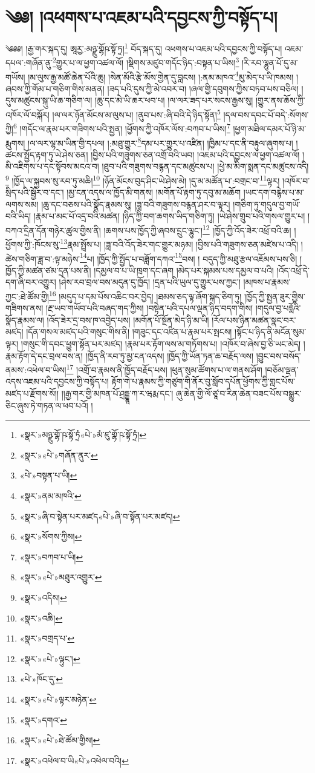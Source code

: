 \chapter{༄༅། །འཕགས་པ་འཇམ་པའི་དབྱངས་ཀྱི་བསྟོད་པ།}༄༅༅། །རྒྱ་གར་སྐད་དུ། ཨཱརྱ་:མཉྫུ་གྷོཥ་སྟོ་ཏྲ།\footnote{«སྣར་»མཉྫུ་གྷོ་ཥ་སྟོ་ཏྲཾ«པེ་»མཾ་ཛུ་གྷོ་ཥ་སྟོ་ཏྲཾ།} བོད་སྐད་དུ། འཕགས་པ་འཇམ་པའི་དབྱངས་ཀྱི་བསྟོད་པ། འཇམ་དཔལ་:གཞོན་ནུ་\footnote{«སྣར་»«པེ་»གཞོན་ནུར་}གྱུར་པ་ལ་ཕྱག་འཚལ་ལོ། །སྡིགས་མཛུབ་གདོང་ཉིད་:བསྟན་པ་ཡིས།\footnote{«པེ་»བསྟན་པ་ཡི།} །རི་རབ་ལྷུན་པོ་དུ་མ་གཡོས། །མ་ལུས་རྒྱ་མཚོ་ཆེན་པོའི་ཆུ། །སེན་མོའི་རྩེ་མོས་གྱེན་དུ་བླངས། །:ནམ་མཁའ་\footnote{«སྣར་»ནམ་མཁའི་}མུ་མེད་པ་ཡི་ཁམས། །ཞབས་ཀྱི་གོམ་པ་གཅིག་གིས་མནན། །ཟད་པའི་དུས་ཀྱི་མེ་འབར་བ། །ཞལ་གྱི་དབུགས་ཀྱིས་བཏབ་པས་བཅིལ། །དུས་མཚུངས་སྐུ་ཡི་ཆ་གཅིག་ལ། །ཆུ་དང་མེ་ཡི་ཆར་ཕབ་པ། །ལ་ལར་ཟད་པར་སངས་རྒྱས་སུ། །གྱུར་ནས་ཆོས་ཀྱི་འཁོར་ལོ་བསྐོར། །ལ་ལར་ཉོན་མོངས་མ་ལུས་པ། །ནུབ་པས་:ཞི་བའི་དེ་ཉིད་སྟོན།\footnote{«སྣར་»ཞི་བ་སྟེན་པར་མཛད«པེ་»ཞི་བ་སྟོན་པར་མཛད།} །དལ་བས་དབང་པོ་བདེ་:སོགས་ཀྱི།\footnote{«སྣར་»སོགས་ཀྱིས།} །གདོང་ལ་རྣམ་པར་གཟིགས་པའི་སྤྱན། །ཕྱོགས་ཀྱི་འཁོར་ལོས་:བཀབ་པ་ཡིས།\footnote{«སྣར་»བཀབ་པ་ཡི།} །ཕྱག་མཐིལ་དམར་པོ་ཉི་མ་རྨུགས། །ལ་ལར་ལྷ་མ་ཡིན་གྱི་དཔལ། །:མཐུ་གྱུར་\footnote{«སྣར་»«པེ་»མཐུར་འགྱུར་}དམ་པར་གྱུར་པ་འཛིན། །ཁྱིམ་པ་དང་ནི་བརྟུལ་ཞུགས་པ། །ཚངས་སྤྱོད་རྟག་ཏུ་ཡེ་ཤེས་ཅན། །བྱིས་པའི་གཟུགས་ཅན་འགྲོ་བའི་ཡབ། །འཇམ་པའི་དབྱངས་ལ་ཕྱག་འཚལ་ལོ། །མི་འཇིགས་པ་དང་སྟོབས་མངའ་བ། །ཐུབ་པའི་གཟུགས་བརྙན་དང་མཚུངས་པ། །ཕྱེ་མ་མིག་སྨན་དང་མཚུངས་འདི།\footnote{«སྣར་»འདིས།} །ཁྱོད་ལ་སྐྱབས་སུ་རབ་ཏུ་མཆི།\footnote{«སྣར་»འཆི།} །ཉོན་མོངས་བུད་ཤིང་ཡེ་ཤེས་མེ། །དུ་མ་མཚོན་པ་:བགྲང་བ་\footnote{«སྣར་»བགྲད་པ་}ལྟར། །འཁོར་བ་སྲིད་པའི་སྦྱོར་བ་དང་། །མྱ་ངན་འདས་ལ་ཁྱོད་མི་གནས། །མགོན་པོ་རྟག་ཏུ་དབུ་མ་མཆོག །ཡང་དག་བརྙེས་པ་མ་ལགས་སམ། །ཆུ་དང་བཅས་པའི་སྣོད་རྣམས་སུ། །ཟླ་བའི་གཟུགས་བརྙན་ཤར་བ་ལྟར། །གཅིག་ཏུ་གདུལ་བྱ་གཡོ་བའི་ཡིད། །རྣམ་པ་མང་པོ་འདྲ་བའི་མཚན། །ཉིད་ཀྱི་བག་ཆགས་ཡིད་གཅིག་ཏུ། །ཡེ་ཤེས་གྲུབ་པའི་གསལ་གྱུར་པ། །བཀའ་དྲིན་དོན་གཉེར་ཚུལ་གྱིས་ནི། །ཆགས་པས་ཁྱོད་ཀྱི་ཞབས་དྲུང་ལྷུང་།\footnote{«སྣར་»«པེ་»ལྟུང་།} །ཁྱོད་ཀྱི་འོད་ཟེར་འཕྲོ་བའི་ཆ། །ཕྱོགས་ཀྱི་:ཁོངས་སུ་\footnote{«པེ་»ཁོང་དུ་}རྣམ་སྤྲོས་པ། །ཟླ་བའི་འོད་ཟེར་གང་གྱུར་མཉམ། །བྱིས་པའི་གཟུགས་ཅན་མཛེས་པ་འདི། །ཚེས་གཅིག་ཟླ་བ་:ལྟ་མཉེས་\footnote{«སྣར་»«པེ་»ལྟར་མཉེན་}པ། །ཁྱོད་ཀྱི་སྤྱོད་པ་བཟློག་དཀའ་\footnote{«སྣར་»དགའ་}བས། །
བདུད་ཀྱི་མཐུ་རྩལ་འཇོམས་པས་ཅི། །ཁྱོད་ཀྱི་མཚན་ཙམ་དྲན་པས་ནི། །དམྱལ་བ་པ་ཡི་ཁྲག་དང་ཞག །མེད་པར་སྐམས་པས་དམྱལ་བ་པའི། །འོད་འཕྲོ་དེ་དག་ཞི་བར་འགྱུར། །ཤེས་རབ་བྲལ་བས་མདུན་དུ་ཁྱོད། །དྲན་པའི་ཡུལ་དུ་གྱུར་པས་ཀྱང་། །མཁས་པ་རྣམས་ཀྱང་:ཐེ་ཚོམ་གྱི།\footnote{«སྣར་»«པེ་»ཐེ་ཚོམ་གྱིས།} །མདུད་པ་དམ་པོས་འཆིང་བར་བྱེད། །ཐམས་ཅད་ལྟ་ཞོག་སྐད་ཅིག་ཏུ། །ཁྱོད་ཀྱི་སྤྱན་ཟུར་གྱིས་གཟིགས་ནས། །རྔ་ཡབ་གཡོབ་པའི་བཞད་གད་ཀྱིས། །བསྟེན་པའི་དཔལ་ལྡན་ཉིད་བདག་གིས། །གདུལ་བྱ་པདྨོའི་སྣོད་རྣམས་ལ། །འོད་ཟེར་དྲ་བས་ཁ་འབྱེད་པས། །མགོན་པོ་སྔོན་མེད་ཉི་མ་ཡི། །རོལ་པས་ཉིན་མཚན་སྣང་བར་མཛད། །དོན་གསལ་མཛད་པའི་གསུང་གིས་ནི། །གཟུང་དང་འཛིན་པ་རྣམ་པར་སྤངས། །སྟོང་པ་ཉིད་ནི་མངོན་སུམ་ལྟར། །གསུང་གི་དབང་ཕྱུག་སྟོན་པར་མཛད། །རྣམ་པར་རྟོག་ལས་མ་གཏོགས་པ། །འཁོར་བ་ཞེས་བྱ་ཅི་ཡང་མེད། །རྣམ་རྟོག་དེ་དང་བྲལ་བས་ན། །ཁྱོད་ནི་རབ་ཏུ་མྱ་ངན་འདས། །ཁྱོད་ཀྱི་ཡོན་ཏན་ཆ་བརྗོད་ལས། །བྱུང་བས་བསོད་ནམས་:འཕེལ་བ་ཡིས།\footnote{«སྣར་»འཕེལ་བ་ཡི«པེ་»འཕེལ་བའི།} །འགྲོ་བ་རྣམས་ནི་ཁྱོད་བརྗོད་པས། །ཕུན་སུམ་ཚོགས་པ་ལ་གནས་ཤོག །བཅོམ་ལྡན་འདས་འཇམ་པའི་དབྱངས་ཀྱི་བསྟོད་པ། རྟོག་གེ་པ་རྣམས་ཀྱི་གཙུག་གི་ནོར་བུ་སློབ་དཔོན་ཕྱོགས་ཀྱི་གླང་པོས་མཛད་པ་རྫོགས་སོ།། །།རྒྱ་གར་གྱི་མཁན་པོ་ཤྲདྡྷཱ་ཀ་ར་ཝརྨ་དང་། ཞུ་ཆེན་གྱི་ལོ་ཙཱ་བ་རིན་ཆེན་བཟང་པོས་བསྒྱུར་ཅིང་ཞུས་ཏེ་གཏན་ལ་ཕབ་པའོ། ། 